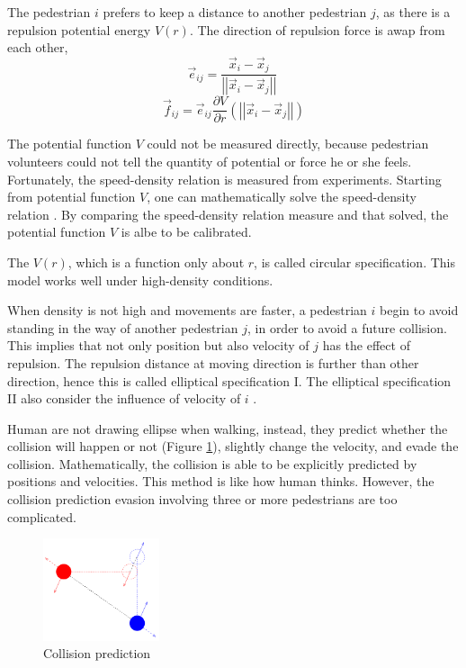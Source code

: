 \documentclass{article}
\newcommand{\lb}{\left(}
\newcommand{\rb}{\right)}
\newcommand{\db}[1]{{\lb {#1} \rb}}
\newcommand{\abs}[1]{\left| {#1} \right|}
\newcommand{\pfrac}[2]{\frac{\partial{#1}}{\partial{#2}}}
\begin{document}
        The pedestrian $i$ prefers to keep a distance to another pedestrian $j$,
        as there is a repulsion potential energy $V\db{r}$.
        The direction of repulsion force is awap from each other,
        $$
            \vec{e}_{ij} = \frac{\vec{x}_i-\vec{x}_j}{\abs{\abs{\vec{x}_i-\vec{x}_j}}}\
        $$
        $$
            \vec{f}_{ij} = \vec{e}_{ij}\pfrac{V}{r}\db{\abs{\abs{\vec{x}_i-\vec{x}_j}}}
        $$

        The potential function $V$ could not be measured directly, because pedestrian volunteers could not tell the quantity of potential or force he or she feels. Fortunately, the speed-density relation is measured from experiments. Starting from potential function $V$, one can mathematically solve the speed-density relation \cite{kretz2015inflection}. By comparing the speed-density relation measure and that solved, the potential function $V$ is albe to be calibrated.

        The $V\db{r}$, which is a function only about $r$, is called circular specification. This model works well under high-density conditions.

        When density is not high and movements are faster, a pedestrian $i$ begin to avoid standing in the way of another pedestrian $j$, in order to avoid a future collision. This implies that not only position but also velocity of $j$ has the effect of repulsion. The repulsion distance at moving direction is further than other direction, hence this is called elliptical specification I.  
        The elliptical specification II also consider the influence of velocity of $i$ \cite{johansson2007specification}.

        Human are not drawing ellipse when walking, instead, they predict whether the collision will happen or not (Figure \ref{img_collisionprediction}), slightly change the velocity, and evade the collision. Mathematically, the collision is able to be explicitly predicted \cite{zanlungo2011social} by positions and velocities. This method is like how human thinks. However, the collision prediction evasion involving three or more pedestrians are too complicated.

        \begin{figure}[htb]
            \centering
            \includegraphics[natwidth=398,natheight=351,height=3cm]{img/collisionprediction.png}
            \caption{Collision prediction}
            \label{img_collisionprediction}
        \end{figure}
\end{document}
